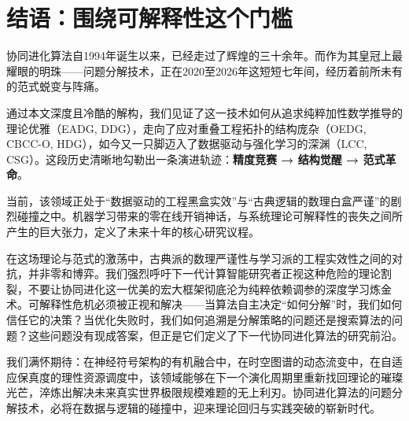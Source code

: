 \section{结语：围绕可解释性这个门槛}
协同进化算法自1994年诞生以来，已经走过了辉煌的三十余年。而作为其皇冠上最耀眼的明珠——问题分解技术，正在2020至2026年这短短七年间，经历着前所未有的范式蜕变与阵痛。

通过本文深度且冷酷的解构，我们见证了这一技术如何从追求纯粹加性数学推导的理论优雅（EADG, DDG），走向了应对重叠工程拓扑的结构庞杂（OEDG, CBCC-O, HDG），如今又一只脚迈入了数据驱动与强化学习的深渊（LCC, CSG）。这段历史清晰地勾勒出一条演进轨迹：\textbf{精度竞赛 → 结构觉醒 → 范式革命}。

当前，该领域正处于“数据驱动的工程黑盒实效”与“古典逻辑的数理白盒严谨”的剧烈碰撞之中。机器学习带来的零在线开销神话，与系统理论可解释性的丧失之间所产生的巨大张力，定义了未来十年的核心研究议程。

在这场理论与范式的激荡中，古典派的数理严谨性与学习派的工程实效性之间的对抗，并非零和博弈。我们强烈呼吁下一代计算智能研究者正视这种危险的理论割裂，不要让协同进化这一优美的宏大框架彻底沦为纯粹依赖调参的深度学习炼金术。可解释性危机必须被正视和解决——当算法自主决定“如何分解”时，我们如何信任它的决策？当优化失败时，我们如何追溯是分解策略的问题还是搜索算法的问题？这些问题没有现成答案，但正是它们定义了下一代协同进化算法的研究前沿。

我们满怀期待：在神经符号架构的有机融合中，在时空图谱的动态流变中，在自适应保真度的理性资源调度中，该领域能够在下一个演化周期里重新找回理论的璀璨光芒，淬炼出解决未来真实世界极限规模难题的无上利刃。协同进化算法的问题分解技术，必将在数据与逻辑的碰撞中，迎来理论回归与实践突破的崭新时代。
